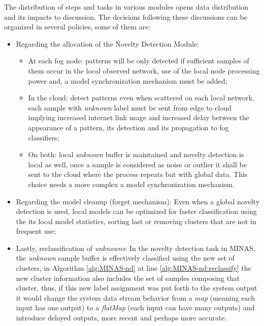 The distribution of steps and tasks in various modules opens
data distribution and its impacts to discussion.
The decisions following these discussions can be organized in
several policies, some of them are:

\begin{itemize}
    \item Regarding the allocation of the Novelty Detection Module:
    \begin{itemize}
        \item At each fog node:
        patterns will be only detected if sufficient samples of them
        occur in the local observed network,
        use of the local node processing power and,
        a model synchronization mechanism must be added;
        \item In the cloud:
        detect patterns even when scattered on each local network,
        each sample with \emph{unknown} label must be sent from edge to cloud implying 
        increased internet link usage and increased delay
        between the appearance of a pattern, its detection and its propagation
        to fog classifiers;
        \item On both:
        local \emph{unknown} buffer is maintained and novelty detection is local as well,
        once a sample is considered as noise or outlier it shall be sent to the cloud
        where the process repeats but with global data.
        This choice needs a more complex a model synchronization mechanism.
    \end{itemize}
    \item Regarding the model cleanup (forget mechanism):
    Even when a global novelty detection is used, local models can be optimized for faster
    classification using the its local model statistics, sorting last or removing clusters that
    are not in frequent use;
    \item Lastly, reclassification of \emph{unknowns}:
    In the novelty detection task in MINAS, the \emph{unknown} sample buffer is effectively
    classified using the new set of clusters, in 
    Algorithm \ref{alg:MINAS-nd} at line \ref{alg:MINAS-nd:reclassify} 
    the new cluster information also includes the set of samples composing that cluster,
    thus, if this new label assignment was put forth to the system output
    it would change the system data stream behavior from a 
    \emph{map} (meaning each input has one output)
    to a \emph{flatMap} (each input can have many outputs)
    and introduce delayed outputs, more recent and perhaps more accurate.
\end{itemize}


